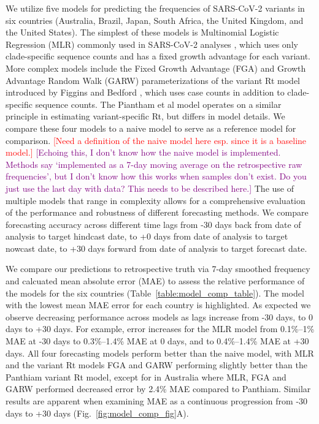 \documentclass[11pt,oneside,letterpaper]{article}
\def\jhc#1{\textcolor{red}{[#1]}}
\def\tbc#1{\textcolor{purple}{[#1]}}
\begin{document}
We utilize five models for predicting the frequencies of SARS-CoV-2 variants in six countries (Australia, Brazil, Japan, South Africa, the United Kingdom, and the United States).
The simplest of these models is Multinomial Logistic Regression (MLR) commonly used in SARS-CoV-2 analyses \cite{annavajhala2021emergence, faria2021genomics, obermeyer2022analysis}, which uses only clade-specific sequence counts and has a fixed growth advantage for each variant.
More complex models include the Fixed Growth Advantage (FGA) and Growth Advantage Random Walk (GARW) parameterizations of the variant Rt model introduced by Figgins and Bedford \cite{figgins2022sars}, which uses case counts in addition to clade-specific sequence counts.
The Piantham et al model \cite{piantham2021estimating} operates on a similar principle in estimating variant-specific Rt, but differs in model details.
We compare these four models to a naive model to serve as a reference model for comparison.
\jhc{Need a definition of the naive model here esp. since it is a baseline model.}
\tbc{Echoing this, I don't know how the naive model is implemented. Methods say `implemented as a 7-day moving average on the retrospective raw frequencies', but I don't know how this works when samples don't exist. Do you just use the last day with data? This needs to be described here.}
The use of multiple models that range in complexity allows for a comprehensive evaluation of the performance and robustness of different forecasting methods.
We compare forecasting accuracy across different time lags from -30 days back from date of analysis to target hindcast date, to +0 days from date of analysis to target nowcast date, to +30 days forward from date of analysis to target forecast date.

We compare our predictions to retrospective truth via 7-day smoothed frequency and calcuated mean absolute error (MAE) to assess the relative performance of the models for the six countries (Table~\ref{table:model_comp_table}).
The model with the lowest mean MAE error for each country is highlighted.
As expected we observe decreasing performance across models as lags increase from -30 days, to 0 days to +30 days.
For example, error increases for the MLR model from 0.1\%--1\% MAE at -30 days to 0.3\%--1.4\% MAE at 0 days, and to 0.4\%--1.4\% MAE at +30 days.
All four forecasting models perform better than the naive model, with MLR and the variant Rt models FGA and GARW performing slightly better than the Panthiam variant Rt model, except for in Australia where MLR, FGA and GARW performed decreased error by 2.4\% MAE compared to Panthiam.
Similar results are apparent when examining MAE as a continuous progression from -30 days to +30 days (Fig.~\ref{fig:model_comp_fig}A).
\end{document}
